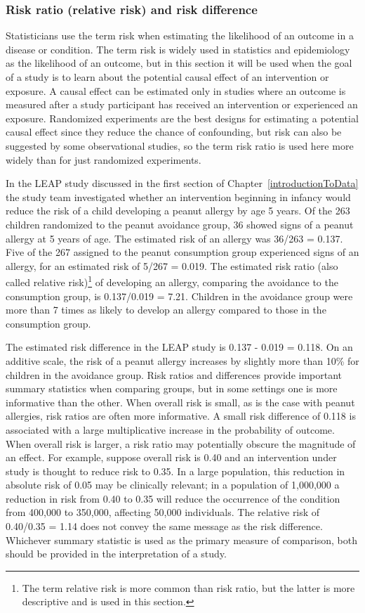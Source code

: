 \subsubsection{Risk ratio (relative risk) and risk difference}


Statisticians use the term risk when estimating the likelihood of an outcome in a disease or condition. The term risk is widely used in statistics and epidemiology as the likelihood of an outcome, but in this section it will be used when the goal of a study is to learn about the potential causal effect of an intervention or exposure. A causal effect can be estimated only in studies where an outcome is measured after a study participant has received an intervention or experienced an exposure. Randomized experiments are the best designs for estimating a potential causal effect since they reduce the chance of confounding, but risk can also be suggested by some observational studies, so the term risk ratio is used here more widely than for just randomized experiments.

 In the LEAP study discussed in the first section of Chapter~\ref{introductionToData} the study team investigated whether an intervention beginning in infancy would reduce the risk  of a child developing a peanut allergy by age 5 years. Of the 263 children randomized to the peanut avoidance group, 36 showed signs of a peanut allergy at 5 years of age.  The estimated risk of an allergy was 36/263 = 0.137.  Five of the 267 assigned to the peanut consumption group experienced signs of an allergy, for an estimated risk of 5/267 = 0.019. The estimated risk ratio (also called relative risk)\footnote{The term relative risk is more common than risk ratio, but the latter is more descriptive and is used in this section.} of developing an allergy, comparing the avoidance to the consumption group, is 0.137/0.019 = 7.21.  Children in the avoidance group were more than 7 times as likely to develop an allergy compared to those in the consumption group.

The estimated risk difference in the LEAP study is 0.137 - 0.019 = 0.118.  On an additive scale, the risk of a peanut allergy increases by slightly more than 10\% for children in the avoidance group.  Risk ratios and differences provide important summary statistics when comparing groups, but in some settings one is more informative than the other.  When overall risk is small, as is the case with peanut allergies, risk ratios are often more informative.  A small risk difference of 0.118 is associated with a large multiplicative increase in the probability of outcome. When overall risk is larger, a risk ratio may potentially obscure the magnitude of an effect. For example, suppose overall risk is 0.40 and an intervention under study is thought to reduce risk to 0.35. In a large population, this reduction in absolute risk of 0.05 may be clinically relevant; in a population of 1,000,000 a reduction in risk from 0.40 to 0.35 will reduce the occurrence of the condition from 400,000 to 350,000, affecting 50,000 individuals. The relative risk of 0.40/0.35 = 1.14 does not convey the same message as the risk difference. Whichever summary statistic is used as the primary measure of comparison, both should be provided in the interpretation of a study.

